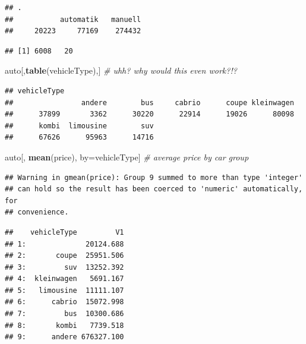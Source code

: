 \documentclass[]{book}
\newenvironment{Shaded}{\begin{snugshade}}{\end{snugshade}}
\newcommand{\KeywordTok}[1]{\textcolor[rgb]{0.13,0.29,0.53}{\textbf{#1}}}
\newcommand{\StringTok}[1]{\textcolor[rgb]{0.31,0.60,0.02}{#1}}
\newcommand{\CommentTok}[1]{\textcolor[rgb]{0.56,0.35,0.01}{\textit{#1}}}
\newcommand{\OperatorTok}[1]{\textcolor[rgb]{0.81,0.36,0.00}{\textbf{#1}}}
\newcommand{\NormalTok}[1]{#1}
\theoremstyle{definition}
\theoremstyle{definition}
\theoremstyle{definition}
\theoremstyle{remark}
\begin{document}
\begin{verbatim}
## .
##           automatik   manuell 
##     20223     77169    274432
\end{verbatim}

\begin{Shaded}
\end{Shaded}

\begin{verbatim}
## [1] 6008   20
\end{verbatim}

\begin{Shaded}
\begin{Highlighting}[]
\NormalTok{auto[,}\KeywordTok{table}\NormalTok{(vehicleType),] }\CommentTok{# uhh? why would this even work?!?}
\end{Highlighting}
\end{Shaded}

\begin{verbatim}
## vehicleType
##                andere        bus     cabrio      coupe kleinwagen 
##      37899       3362      30220      22914      19026      80098 
##      kombi  limousine        suv 
##      67626      95963      14716
\end{verbatim}

\begin{Shaded}
\begin{Highlighting}[]
\NormalTok{auto[, }\KeywordTok{mean}\NormalTok{(price), by=vehicleType] }\CommentTok{# average price by car group}
\end{Highlighting}
\end{Shaded}

\begin{verbatim}
## Warning in gmean(price): Group 9 summed to more than type 'integer'
## can hold so the result has been coerced to 'numeric' automatically, for
## convenience.
\end{verbatim}

\begin{verbatim}
##    vehicleType         V1
## 1:              20124.688
## 2:       coupe  25951.506
## 3:         suv  13252.392
## 4:  kleinwagen   5691.167
## 5:   limousine  11111.107
## 6:      cabrio  15072.998
## 7:         bus  10300.686
## 8:       kombi   7739.518
## 9:      andere 676327.100
\end{verbatim}
\end{document}
